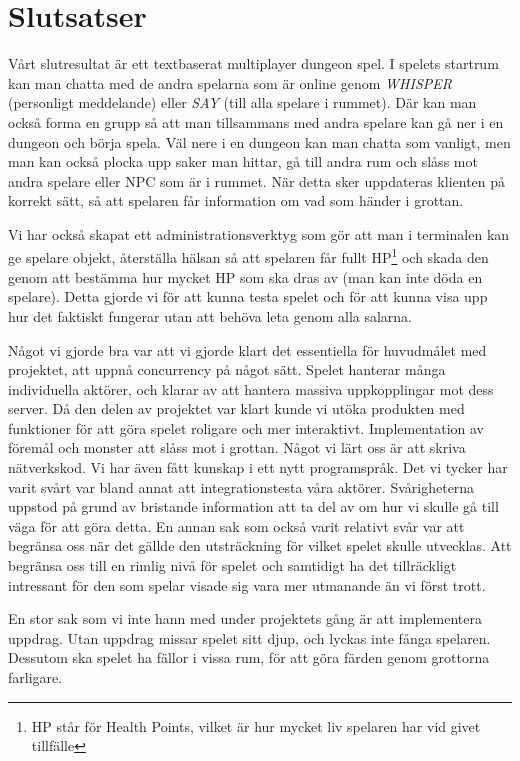 \documentclass[a4paper]{article}
\begin{document}
\section{Slutsatser}
Vårt slutresultat är ett textbaserat multiplayer dungeon spel. I spelets startrum kan man chatta med de andra spelarna som är online genom \textit{WHISPER} (personligt meddelande) eller \textit{SAY} (till alla spelare i rummet). Där kan man också forma en grupp så att man tillsammans med andra spelare kan gå ner i en dungeon och börja spela. Väl nere i en dungeon kan man chatta som vanligt, men man kan också plocka upp saker man hittar, gå till andra rum och slåss mot andra spelare eller NPC som är i rummet. När detta sker uppdateras klienten på korrekt sätt, så att spelaren får information om vad som händer i grottan.

Vi har också skapat ett administrationsverktyg som gör att man i terminalen kan ge spelare objekt, återställa hälsan så att spelaren får fullt HP\footnote{HP står för Health Points, vilket är hur mycket liv spelaren har vid givet tillfälle} och skada den genom att bestämma hur mycket HP som ska dras av (man kan inte döda en spelare). Detta gjorde vi för att kunna testa spelet och för att kunna visa upp hur det faktiskt fungerar utan att behöva leta genom alla salarna.     

Något vi gjorde bra var att vi gjorde klart det essentiella för huvudmålet med projektet, att uppnå concurrency på något sätt. Spelet hanterar många individuella aktörer, och klarar av att hantera massiva uppkopplingar mot dess server. 
Då den delen av projektet var klart kunde vi utöka produkten med funktioner för att göra spelet roligare och mer interaktivt. 
Implementation av föremål och monster att slåss mot i grottan. 
Något vi lärt oss är att skriva nätverkskod. Vi har även fått kunskap i ett nytt programspråk.
Det vi tycker har varit svårt var bland annat att integrationstesta våra aktörer. Svårigheterna uppstod på grund av bristande 
information att ta del av om hur vi skulle gå till väga för att göra detta. En annan sak som också varit relativt svår var att 
begränsa oss när det gällde den utsträckning för vilket spelet skulle utvecklas. Att begränsa oss till en rimlig nivå för spelet 
och samtidigt ha det tillräckligt intressant för den som spelar visade sig vara mer utmanande än vi först trott.


En stor sak som vi inte hann med under projektets gång är att implementera uppdrag. Utan uppdrag missar spelet sitt djup, och lyckas inte fånga spelaren. Dessutom ska spelet ha fällor i vissa rum, för att göra färden genom grottorna farligare. 
\end{document}
